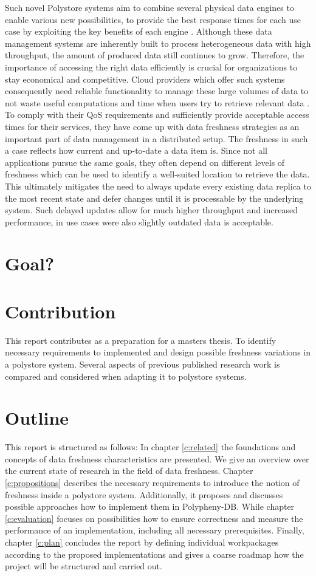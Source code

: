 Such novel Polystore systems aim to combine several physical data engines to enable various
new possibilities, to provide the best response times for each use case by exploiting
the key benefits of each engine \cite{stonebraker:2005}. Although these data management systems are inherently
built to process heterogeneous data with high throughput, the amount of produced data
still continues to grow.
Therefore, the importance of accessing the right data efficiently is crucial
for organizations to stay economical and competitive. Cloud providers which offer such systems consequently 
need reliable functionality to manage these large volumes of data to not waste useful computations and time when users
try to retrieve relevant data \cite{levandowski2013}.
To comply with their QoS requirements and sufficiently provide acceptable access times for their services, 
they have come up with data freshness strategies as an important part of data management in a
distributed setup. 
The freshness in such a case reflects how current and up-to-date a data item is.
Since not all applications pursue the same goals, they often depend on different levels of freshness which can be used to identify a well-suited location
to retrieve the data. This ultimately mitigates the need to always update every existing data replica to the most recent state and defer changes until
it is processable by the underlying system.
Such delayed updates allow for much higher throughput and increased performance, in use cases were also slightly outdated data 
is acceptable.

\section{Goal?}

\section{Contribution}
This report contributes as a preparation for a masters thesis. To identify necessary requirements to implemented and design possible 
freshness variations in a polystore system. Several aspects of previous published research work is compared and considered when adapting it to polystore systems.

\section{Outline}
This report is structured as follows:
In chapter \ref{c:related} the foundations and concepts of data freshness characteristics are presented.
We give an overview over the current state of research in the field of data freshness.
Chapter \ref{c:propositions} describes the necessary requirements to introduce the notion of freshness inside a polystore system. Additionally, it proposes and discusses
possible approaches how to implement them in Polypheny-DB.
While chapter \ref{c:evaluation} focuses on possibilities how to ensure correctness and measure the performance of an implementation, including all necessary prerequisites.
Finally, chapter \ref{c:plan} concludes the report by defining individual workpackages according to the proposed
implementations and gives a coarse roadmap how the project will be structured and carried out.


